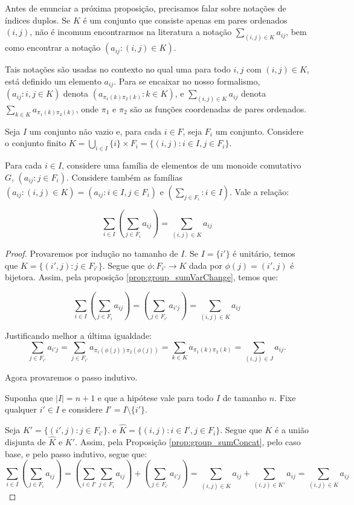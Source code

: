 Antes de enunciar a próxima proposição, precisamos falar sobre notações de índices duplos.
Se $K$ é um conjunto que consiste apenas em pares ordenados $(i, j)$, não é incomum encontrarmos na literatura a notação $\sum_{(i, j)\in K}a_{ij}$,
bem como encontrar a notação $(a_{ij}:(i, j)\in K)$.

Tais notações são usadas no contexto no qual uma para todo $i, j$ com $(i, j)\in K$, está definido um elemento $a_{ij}$.
Para se encaixar no nosso formalismo, $(a_{ij}:i, j \in K)$ denota $(a_{\pi_1(k)\pi_2(k)}: k \in K)$, e $\sum_{(i, j)\in K}a_{ij}$ denota $\sum_{k \in K}a_{\pi_1(k)\pi_2(k)}$, onde $\pi_1$ e $\pi_2$ são as funções coordenadas de pares ordenados.

\begin{prop}\label{prop:group_sumConcatII}
    Seja $I$ um conjunto não vazio e, para cada $i \in F$, seja $F_i$ um conjunto.
    Considere o conjunto finito $K=\bigcup_{i \in I}\{i\}\times F_i=\{(i, j): i \in I, j \in F_i\}$.

    Para cada $i \in I$, considere uma família de elementos de um monoide comutativo $G$, $(a_{ij}: j \in F_i)$.
    Considere também as famílias $(a_{ij}: (i, j)\in K)=(a_{ij}: i\in I, j \in F_i)$ e $(\sum_{j \in F_i}: i\in I)$. Vale a relação:

    \[\sum_{i \in I}\left(\sum_{j \in F_i}a_{ij}\right)=\sum_{(i, j)\in K}a_{ij}\]
\end{prop}
\begin{proof}
    Provaremos por indução no tamanho de $I$.
    Se $I=\{i'\}$ é unitário, temos que $K=\{(i', j): j \in F_{i'}\}$.
    Segue que $\phi:F_{i'}\rightarrow K$ dada por $\phi(j)=(i', j)$ é bijetora.
    Assim, pela proposição \ref{prop:group_sumVarChange}, temos que:

    \[\sum_{i \in I}\left(\sum_{j \in F_i}a_{ij}\right)=\left(\sum_{j \in F_{i'}}a_{i'j}\right)=\sum_{(i, j)\in K}a_{ij}\]

    Justificando melhor a última igualdade:
    \[\sum_{j \in F_{i'}}a_{i'j}=\sum_{j \in F_{i'}}a_{\pi_1(\phi(j))\pi_2(\phi(j))}=\sum_{k \in K}a_{\pi_1(k)\pi_2(k)}=\sum_{(i, j)\in J}a_{ij}.\]
    
    Agora provaremos o passo indutivo.

    Suponha que $|I|=n+1$ e que a hipótese vale para todo $I$ de tamanho $n$. Fixe qualquer $i' \in I$ e considere $I'=I\setminus \{i'\}$.

    Seja $K'=\{(i', j): j \in F_{i'}\}$. e $\hat K=\{(i, j): i \in I', j \in F_i\}$.
    Segue que $K$ é a união disjunta de $\hat K$ e $K'$.
    Assim, pela Proposição \ref{prop:group_sumConcat}, pelo caso base, e pelo passo indutivo, segue que:
    \[\sum_{i \in I}\left(\sum_{j \in F_i}a_{ij}\right)=\left(\sum_{i \in I'}\sum_{j \in F_{i}}a_{ij}\right)+\left(\sum_{j \in F_{i'}}a_{i'j}\right)=\sum_{(i, j)\in \hat K}a_{ij}+\sum_{(i, j)\in K'}a_{ij}=\sum_{(i, j)\in K}a_{ij}\]
\end{proof}

